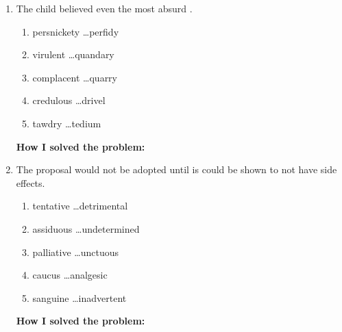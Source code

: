 \begin{enumerate} 
\item The \longline child believed even the  most absurd \hrulefill.

\begin{enumerate} [label=(\Alph*)]
\item persnickety \ldots perfidy
\item virulent \ldots quandary
\item complacent \ldots quarry
\item credulous \ldots drivel
\item tawdry \ldots tedium
\end{enumerate}

\textbf{\large How I solved the problem:} \hrulefill

\hrulefill

\item The \longline proposal would not be adopted until is could be shown to not have \longline side effects.

\begin{enumerate} [label=(\Alph*)]
\item tentative \ldots detrimental
\item assiduous \ldots undetermined
\item palliative \ldots unctuous
\item caucus \ldots analgesic
\item sanguine \ldots inadvertent
\end{enumerate} 

\textbf{\large How I solved the problem:} \hrulefill

\hrulefill
\end{enumerate}